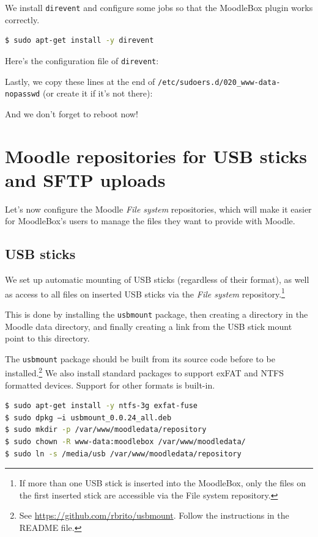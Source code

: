 \documentclass[12pt]{article}
\begin{document}
We install \lstinline{direvent} and configure some jobs so that the MoodleBox plugin works correctly.
\begin{lstlisting}[language=bash]
$ sudo apt-get install -y direvent
\end{lstlisting}
Here's the configuration file of \lstinline{direvent}:


Lastly, we copy these lines at the end of \lstinline{/etc/sudoers.d/020_www-data-nopasswd} (or create it if it's not there):


And we don't forget to reboot now!

\section{Moodle repositories for USB sticks and SFTP uploads}

Let's now configure the Moodle \textsl{File system} repositories, which will make it easier for MoodleBox's users to manage the files they want to provide with Moodle.

\subsection{USB sticks}

We set up automatic mounting of USB sticks (regardless of their format), as well as access to all files on inserted USB sticks via the \textsl{File system} repository.\footnote{If more than one USB stick is inserted into the MoodleBox, only the files on the first inserted stick are accessible via the File system repository.}

This is done by installing the \lstinline{usbmount} package, then creating a directory in the Moodle data directory, and finally creating a link from the USB stick mount point to this directory.

The \lstinline{usbmount} package should be built from its source code before to be installed.\footnote{See \url{https://github.com/rbrito/usbmount}. Follow the instructions in the README file.}
We also install standard packages to support exFAT and NTFS formatted devices. Support for other formats is built-in.

\begin{lstlisting}[language=bash]
$ sudo apt-get install -y ntfs-3g exfat-fuse
$ sudo dpkg –i usbmount_0.0.24_all.deb
$ sudo mkdir -p /var/www/moodledata/repository
$ sudo chown -R www-data:moodlebox /var/www/moodledata/
$ sudo ln -s /media/usb /var/www/moodledata/repository
\end{lstlisting}
\end{document}
